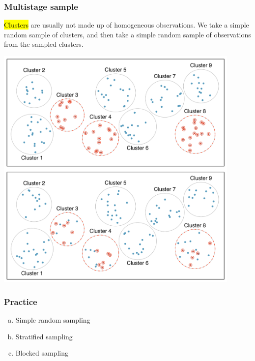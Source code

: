 \begin{frame}
\frametitle{Multistage sample}

\hl{Clusters} are usually not made up of homogeneous observations.  We take a simple random sample of clusters, and then take a simple random sample of observations from the sampled clusters.

\begin{center}
\includegraphics[width=0.9\textwidth]{1-4_obs_studies_sampling/figures/sampling_methods/multistage}
\end{center}

\end{frame}


\begin{frame}
\frametitle{Practice}


\begin{enumerate}[(a)]
\item Simple random sampling
\item Stratified sampling
\item Blocked sampling
\end{enumerate}

\end{frame}

